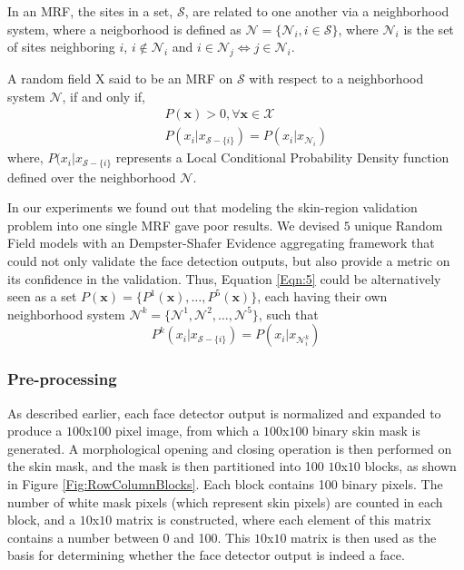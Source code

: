 \documentclass[times, 10pt,twocolumn]{article}
\begin{document}
In an MRF, the sites in a set, $\mathcal S$, are related to one
another via a neighborhood system, where a neigborhood is defined as ${\mathcal
N}=\{{\mathcal N}_i, i \in \mathcal S\}$, where ${\mathcal N}_i$ is
the set of sites neighboring $i$, $i \notin {\mathcal N}_i$ and $i
\in {\mathcal N}_j \Longleftrightarrow j \in {\mathcal N}_i$.

A random field X said to be an MRF on $\mathcal S$ with respect to a
neighborhood system $\mathcal N$, if and only if,
\begin{eqnarray}&& P({\mathbf x})>0, \forall \mathbf x \in \mathcal X  \\ && P(x_i\vert x_{{\mathcal S}-\{i\}})=P(x_i\vert x_{{\mathcal N}_i}) \label{Eqn:5} \end{eqnarray}
where, $P(x_i\vert x_{{\mathcal S}-\{i\}}$ represents a Local
Conditional Probability Density function defined over the
neighborhood $\mathcal N$.

In our experiments we found out that modeling the skin-region
validation problem into one single MRF gave poor results. We devised
$5$ unique Random Field models with an Dempster-Shafer Evidence
aggregating framework that could not only validate the face
detection outputs, but also provide a metric on its confidence in
the validation. Thus, Equation \ref{Eqn:5} could be alternatively
seen as a set $P({\mathbf x}) = \{P^1({\mathbf x}), \ldots,
P^5({\mathbf x})\}$, each having their own neighborhood system
$\mathcal N^k = \{\mathcal N^1, \mathcal N^2, \ldots, \mathcal
N^5\}$, such that
\begin{equation}
P^k(x_i\vert x_{{\mathcal S}-\{i\}})=P(x_i\vert x_{{\mathcal
N^k_i}})
\end{equation}

\subsubsection{Pre-processing}\label{Preprocessing}As described earlier,
each face detector output is normalized and expanded to produce a $100$x$100$ pixel image,
from which a $100$x$100$ binary skin mask is generated.
A morphological opening and closing operation is then performed on the skin mask, and the
mask is then partitioned into 100 $10$x$10$ blocks, as shown in Figure
\ref{Fig:RowColumnBlocks}.  Each block contains 100 binary pixels.  The number of white mask
pixels
(which represent skin pixels) are counted in each block, and a $10$x$10$ matrix is constructed,
where
each element of this matrix contains a number between 0 and 100.
This $10$x$10$ matrix is then used as the basis for determining whether the face detector output
is indeed a face.
\end{document}
